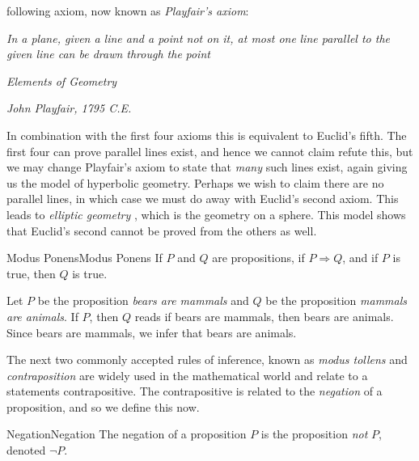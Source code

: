         following axiom, now known as \textit{Playfair's axiom}:
        \begin{center}
            \textit{In a plane, given a line and a point not on it, at most one}
            \textit{line parallel to the given line can be drawn through the}
            \textit{point}
            \par
            \hfill\textit{Elements of Geometry}\par
            \hfill\textit{John Playfair, 1795 C.E.}
        \end{center}
        In combination with the first four axioms this is equivalent to Euclid's
        fifth. The first four can prove parallel lines exist, and hence we
        cannot claim refute this, but we may change Playfair's axiom to state
        that \textit{many} such lines exist, again giving us the model of
        hyperbolic geometry. Perhaps we wish to claim there are no parallel
        lines, in which case we must do away with Euclid's second axiom. This
        leads to \textit{elliptic geometry}%
        , which is the geometry on a sphere. This model
        shows that Euclid's second cannot be proved from the others as well.
        \begin{faxiom}{Modus Ponens}{Modus Ponens}
            If $P$ and $Q$ are propositions, if $P\Rightarrow{Q}$, and if $P$ is
            true, then $Q$ is true.
        \end{faxiom}
        \begin{example}
            Let $P$ be the proposition \textit{bears are mammals} and $Q$ be the
            proposition \textit{mammals are animals}. If $P$, then $Q$ reads
            if bears are mammals, then bears are animals. Since bears are
            mammals, we infer that bears are animals.
        \end{example}
        The next two commonly accepted rules of inference, known as
        \textit{modus tollens} and
        \textit{contraposition} are widely used
        in the mathematical world and relate to a statements contrapositive.
        The contrapositive is related to the \textit{negation} of a proposition,
        and so we define this now.
        \begin{fdefinition}{Negation}{Negation}
            The negation of a proposition $P$ is the proposition \textit{not}
            $P$, denoted $\neg{P}$.
        \end{fdefinition}
